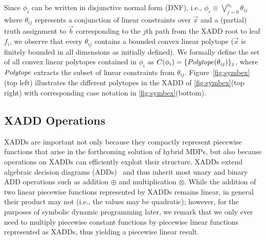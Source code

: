 %

%
Since $\phi_i$ can be written in disjunctive normal form (DNF), i.e.,
$\phi_i \equiv \bigvee_{j=0}^{n_i} \theta_{ij}$ where $\theta_{ij}$
represents a conjunction of linear constraints over $\vec{x}$ and a
(partial) truth assignment to $\vec{b}$ corresponding to the $j$th path
from the XADD root to leaf $f_i$, we observe that every
$\theta_{ij}$ contains a bounded convex linear polytope ($\vec{x}$ is
finitely bounded in all dimensions as initially defined).  
We formally define the set of all convex linear polytopes contained in 
$\phi_i$ as
$C(\phi_i) = \{ \mathit{Polytope}(\theta_{ij}) \}_j$, 
where $\mathit{Polytope}$ extracts the subset of linear constraints from
$\theta_{ij}$. Figure~\ref{fig:symbex}(top left) illustrates the different
polytopes in the XADD of \ref{fig:symbex}(top right) with
corresponding case notation in \ref{fig:symbex}(bottom).

\subsection{XADD Operations} 

XADDs are important not only because they compactly represent
piecewise functions that arise in the forthcoming solution of hybrid
MDPs, but also because operations on XADDs can efficiently exploit
their structure.  XADDs extend algebraic decision diagrams
(ADDs)~\cite{bahar93add} and thus inherit most unary and binary ADD
operations such as addition $\oplus$ and multiplication $\otimes$.
While the addition of two linear piecewise functions represented by
XADDs remains linear, in general their product may not (i.e., the values
may be quadratic); however, for the purposes of symbolic dynamic
programming later, we remark that we only ever need to multiply
piecewise constant functions by piecewise linear functions
represented as XADDs, thus yielding a piecewise linear result.

